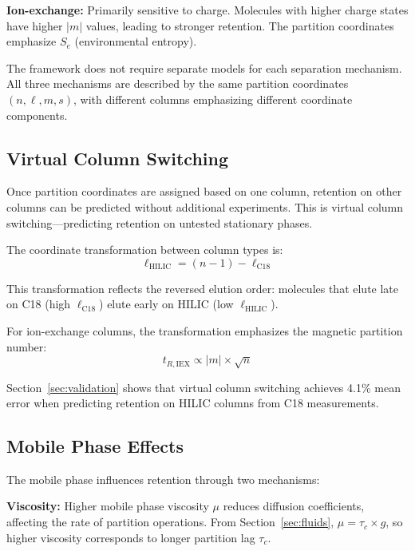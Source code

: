 \documentclass[twocolumn,superscriptaddress,prb,10pt]{revtex4-2}
\begin{document}
\textbf{Ion-exchange:} Primarily sensitive to charge. Molecules with higher charge states have higher $|m|$ values, leading to stronger retention. The partition coordinates emphasize $S_e$ (environmental entropy).

The framework does not require separate models for each separation mechanism. All three mechanisms are described by the same partition coordinates $(n, \ell, m, s)$, with different columns emphasizing different coordinate components.

\subsection{Virtual Column Switching}

Once partition coordinates are assigned based on one column, retention on other columns can be predicted without additional experiments. This is virtual column switching—predicting retention on untested stationary phases.

The coordinate transformation between column types is:
\begin{equation}
\ell_{\text{HILIC}} = (n-1) - \ell_{\text{C18}}
\label{eq:hilic_transform}
\end{equation}

This transformation reflects the reversed elution order: molecules that elute late on C18 (high $\ell_{\text{C18}}$) elute early on HILIC (low $\ell_{\text{HILIC}}$).

For ion-exchange columns, the transformation emphasizes the magnetic partition number:
\begin{equation}
t_{R,\text{IEX}} \propto |m| \times \sqrt{n}
\label{eq:iex_retention}
\end{equation}

Section~\ref{sec:validation} shows that virtual column switching achieves 4.1\% mean error when predicting retention on HILIC columns from C18 measurements.

\subsection{Mobile Phase Effects}

The mobile phase influences retention through two mechanisms:

\textbf{Viscosity:} Higher mobile phase viscosity $\mu$ reduces diffusion coefficients, affecting the rate of partition operations. From Section~\ref{sec:fluids}, $\mu = \tau_c \times g$, so higher viscosity corresponds to longer partition lag $\tau_c$.
\end{document}

